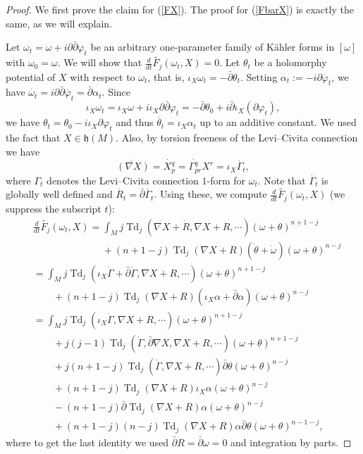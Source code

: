 \documentclass[12pt,reqno,a4paper]{amsart}
\numberwithin{equation}{section}
\def\p{\partial}
\def\bp{\bar\partial}
\def\a{\alpha}
\DeclareMathOperator{\Td}{Td}
\theoremstyle{remark}
\theoremstyle{dotless}
\begin{document}
\begin{proof}
We first prove the claim for (\ref{FX}). The proof for (\ref{FbarX}) is exactly the same, as we will explain.

Let $\omega_t=\omega+i\p\bp \varphi_t$ be an arbitrary one-parameter family of K\"ahler forms in $[\omega]$ with $\omega_0=\omega$. We will show that $\frac{d}{dt}\widetilde{F_j}(\omega_t,X)=0$. Let $\theta_t$ be a holomorphy potential of $X$ with respect to $\omega_t$, that is, $\iota_X \omega_t = -\bp \theta_t$. Setting $\a_t:=-i\p\dot{\varphi_t}$, we have $\dot{\omega_t}=i\p\bp\dot{\varphi_t}=\bp \a_t$.
Since 
\begin{equation*}
\iota_X \omega_t=\iota_X \omega + i\iota_X\p\bp\varphi_t=-\bp\theta_0+i\bp\iota_X (\p\varphi_t), 
\end{equation*}
we have $\theta_t=\theta_0-i\iota_X \p\varphi_t$ and thus $\dot{\theta_t}=\iota_X \a_t$ up to an additive constant.
We used the fact that $X\in\mathfrak{h}(M)$. Also, by torsion freeness of the Levi–Civita connection we have
\begin{equation*}
\dot{\left(\nabla X \right)}=\dot{X^q_p}=\dot{\Gamma^{q}_{pr}}X^r= \iota_X \dot{\Gamma_t},
\end{equation*}
where $\Gamma_t$ denotes the Levi–Civita connection $1$-form for $\omega_t$. Note that $\dot{\Gamma_t}$ is globally well defined and $\dot{R_t}=\bp\dot{\Gamma_t}$. Using these, we compute $\frac{d}{dt}\widetilde{F_j}(\omega_t,X)$ (we suppress the subscript $t$):  
\begin{align}\label{5}
&\frac{d}{dt}\widetilde{F_j}(\omega_t,X)=\int_M j\Td_j (\dot{\nabla X}+\dot{R}, \nabla X + R,\cdots)(\omega+\theta)^{n+1-j}\nonumber\\
&\qquad\qquad\qquad\quad+(n+1-j)\Td_j(\nabla X + R)(\dot{\theta}+\dot{\omega})(\omega+\theta)^{n-j} \nonumber\\
&=\int_M j\Td_j (\iota_X \dot{\Gamma}+\bp\dot{\Gamma}, \nabla X + R,\cdots)(\omega+\theta)^{n+1-j} \nonumber \\
&\qquad +(n+1-j)\Td_j(\nabla X + R)(\iota_X \a+\bp \a)(\omega+\theta)^{n-j}\nonumber\\
&=\int_M j\Td_j (\iota_X \dot{\Gamma}, \nabla X + R,\cdots)(\omega+\theta)^{n+1-j} \nonumber\\
&\qquad+j(j-1)\Td_j (\dot{\Gamma}, \bp\nabla X,\nabla X + R,\cdots)(\omega+\theta)^{n+1-j} \nonumber\\
&\qquad +j(n+1-j)\Td_j (\dot{\Gamma},\nabla X + R,\cdots)\bp\theta(\omega+\theta)^{n-j} \nonumber\\
&\qquad +(n+1-j)\Td_j(\nabla X + R)\iota_X \a (\omega+\theta)^{n-j} \nonumber\\
&\qquad -(n+1-j)\bp\Td_j(\nabla X + R) \a (\omega+\theta)^{n-j} \nonumber\\
&\qquad +(n+1-j)(n-j)\Td_j(\nabla X + R) \a \bp\theta(\omega+\theta)^{n-1-j},
\end{align}
where to get the last identity we used $\bp R=\bp\omega=0$ and integration by parts.


\end{proof}
\end{document}
